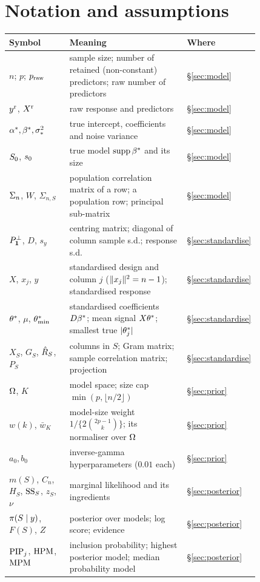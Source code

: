 \section{Notation and assumptions}\label{app:notation}

\begin{longtable}{@{}p{0.27\linewidth}p{0.55\linewidth}l@{}}
\toprule
Symbol & Meaning & Where \\ \midrule \endhead
$n$; $p$; $p_{\mathrm{raw}}$ & sample size; number of retained (non-constant) predictors; raw number of predictors & \S\ref{sec:model} \\
$y^{\mathrm r}$, $X^{\mathrm r}$ & raw response and predictors & \S\ref{sec:model} \\
$\alpha^*,\beta^*,\sigma_*^2$ & true intercept, coefficients and noise variance & \S\ref{sec:model} \\
$S_0$, $s_0$ & true model $\operatorname{supp}\beta^*$ and its size & \S\ref{sec:model} \\
$\Sigma_n$, $W$, $\Sigma_{n,S}$ & population correlation matrix of a row; a population row; principal sub-matrix & \S\ref{sec:model} \\
$P^\perp_{\mathbf{1}}$, $D$, $s_y$ & centring matrix; diagonal of column sample s.d.; response s.d. & \S\ref{sec:standardise} \\
$X$, $x_j$, $y$ & standardised design and column $j$ ($\lVert x_j\rVert^2=n-1$); standardised response & \S\ref{sec:standardise} \\
$\theta^*$, $\mu$, $\theta^*_{\min}$ & standardised coefficients $D\beta^*$; mean signal $X\theta^*$; smallest true $\lvert \theta^*_j\rvert$ & \S\ref{sec:standardise} \\
$X_S$, $G_S$, $\hat R_S$, $P_S$ & columns in $S$; Gram matrix; sample correlation matrix; projection & \S\ref{sec:standardise} \\
$\Omega$, $K$ & model space; size cap $\min(p,\lfloor n/2\rfloor)$ & \S\ref{sec:prior} \\
$w(k)$, $\bar w_K$ & model-size weight $1/\{2\binom{2p-1}{k}\}$; its normaliser over $\Omega$ & \S\ref{sec:prior} \\
$a_0,b_0$ & inverse-gamma hyperparameters ($0.01$ each) & \S\ref{sec:prior} \\
$m(S)$, $C_n$, $H_S$, $\mathrm{SS}_S$, $z_S$, $\nu$ & marginal likelihood and its ingredients & \S\ref{sec:posterior} \\
$\pi(S\mid y)$, $F(S)$, $Z$ & posterior over models; log score; evidence & \S\ref{sec:posterior} \\
$\mathrm{PIP}_j$, $\mathrm{HPM}$, $\mathrm{MPM}$ & inclusion probability; highest posterior model; median probability model & \S\ref{sec:posterior} \\

\end{longtable}
